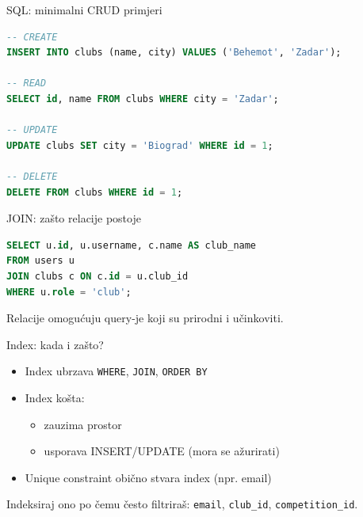 	\begin{frame}[fragile,shrink=5]{SQL: minimalni CRUD primjeri}
\begin{lstlisting}[language=sql]
-- CREATE
INSERT INTO clubs (name, city) VALUES ('Behemot', 'Zadar');

-- READ
SELECT id, name FROM clubs WHERE city = 'Zadar';

-- UPDATE
UPDATE clubs SET city = 'Biograd' WHERE id = 1;

-- DELETE
DELETE FROM clubs WHERE id = 1;
\end{lstlisting}
	\end{frame}
	
	\begin{frame}[fragile,shrink=5]{JOIN: zašto relacije postoje}
\begin{lstlisting}[language=sql]
SELECT u.id, u.username, c.name AS club_name
FROM users u
JOIN clubs c ON c.id = u.club_id
WHERE u.role = 'club';
\end{lstlisting}
		
		\vspace{0.6em}
		Relacije omogućuju query-je koji su prirodni i učinkoviti.
	\end{frame}
	
	\begin{frame}{Index: kada i zašto?}
		\begin{itemize}
			\item Index ubrzava \texttt{WHERE}, \texttt{JOIN}, \texttt{ORDER BY}
			\item Index košta:
			\begin{itemize}
				\item zauzima prostor
				\item usporava INSERT/UPDATE (mora se ažurirati)
			\end{itemize}
			\item Unique constraint obično stvara index (npr. email)
		\end{itemize}
		
		\vspace{0.6em}
		Indeksiraj ono po čemu često filtriraš: \texttt{email}, \texttt{club\_id}, \texttt{competition\_id}.
	\end{frame}
	
